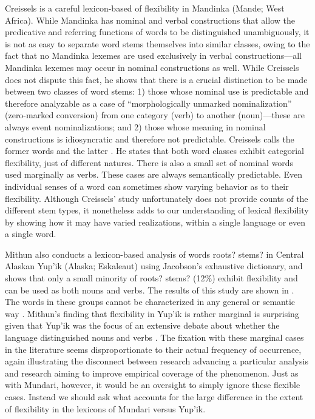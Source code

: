 
Creissels  is a careful lexicon-based of flexibility in Mandinka (Mande; West Africa). While Mandinka has nominal and verbal constructions that allow the predicative and referring functions of words to be distinguished unambiguously, it is not as easy to separate word stems themselves into similar classes, owing to the fact that no Mandinka lexemes are used exclusively in verbal constructions—all Mandinka lexemes may occur in nominal constructions as well. While Creissels does not dispute this fact, he shows that there is a crucial distinction to be made between two classes of word stems: 1) those whose nominal use is predictable and therefore analyzable as a case of \enquote{morphologically unmarked nominalization} (zero-marked conversion) from one category (verb) to another (noun)—these are always event nominalizations; and 2) those whose meaning in nominal constructions is idiosyncratic and therefore not predictable. Creissels calls the former  words and the latter . He states that both word classes exhibit categorial flexibility, just of different natures. There is also a small set of nominal words used marginally as verbs. These cases are always semantically predictable. Even individual senses of a word can sometimes show varying behavior as to their flexibility. Although Creissels' study unfortunately does not provide counts of the different stem types, it nonetheless adds to our understanding of lexical flexibility by showing how it may have varied realizations, within a single language or even a single word.

Mithun  also conducts a lexicon-based analysis of words {{roots? stems?}} in Central Alaskan Yup'ik (Alaska; Eskaleaut) using Jacobson's  exhaustive dictionary, and shows that only a small minority of {{roots? stems?}} (12\%) exhibit flexibility and can be used as both nouns and verbs. The results of this study are shown in . The words in these groups cannot be characterized in any general or semantic way . Mithun's finding that flexibility in Yup'ik is rather marginal is surprising given that Yup'ik was the focus of an extensive debate about whether the language distinguished nouns and verbs . The fixation with these marginal cases in the literature seems disproportionate to their actual frequency of occurrence, again illustrating the disconnect between research advancing a particular analysis and research aiming to improve empirical coverage of the phenomenon. Just as with Mundari, however, it would be an oversight to simply ignore these flexible cases. Instead we should ask what accounts for the large difference in the extent of flexibility in the lexicons of Mundari versus Yup'ik.

